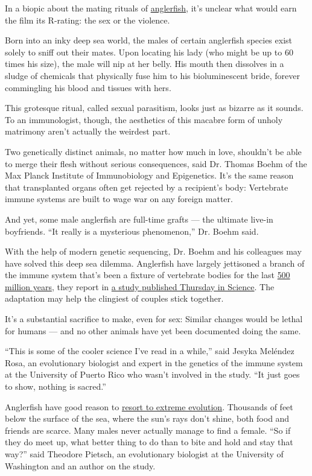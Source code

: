 In a biopic about the mating rituals of
\href{https://www.nytimes3xbfgragh.onion/2019/07/29/science/anglerfish-bioluminescence-deep-sea.html}{anglerfish},
it's unclear what would earn the film its R-rating: the sex or the
violence.

Born into an inky deep sea world, the males of certain anglerfish
species exist solely to sniff out their mates. Upon locating his lady
(who might be up to 60 times his size), the male will nip at her belly.
His mouth then dissolves in a sludge of chemicals that physically fuse
him to his bioluminescent bride, forever commingling his blood and
tissues with hers.

This grotesque ritual, called sexual parasitism, looks just as bizarre
as it sounds. To an immunologist, though, the aesthetics of this macabre
form of unholy matrimony aren't actually the weirdest part.

Two genetically distinct animals, no matter how much in love, shouldn't
be able to merge their flesh without serious consequences, said Dr.
Thomas Boehm of the Max Planck Institute of Immunobiology and
Epigenetics. It's the same reason that transplanted organs often get
rejected by a recipient's body: Vertebrate immune systems are built to
wage war on any foreign matter.

And yet, some male anglerfish are full-time grafts --- the ultimate
live-in boyfriends. ``It really is a mysterious phenomenon,'' Dr. Boehm
said.

With the help of modern genetic sequencing, Dr. Boehm and his colleagues
may have solved this deep sea dilemma. Anglerfish have largely
jettisoned a branch of the immune system that's been a fixture of
vertebrate bodies for the last
\href{https://www.ncbi.nlm.nih.gov/pmc/articles/PMC3805090/}{500 million
years}, they report in
\href{https://science.sciencemag.org/lookup/doi/10.1126/science.aaz9445}{a
study published Thursday in Science}. The adaptation may help the
clingiest of couples stick together.

It's a substantial sacrifice to make, even for sex: Similar changes
would be lethal for humans --- and no other animals have yet been
documented doing the same.

``This is some of the cooler science I've read in a while,'' said Jesyka
Meléndez Rosa, an evolutionary biologist and expert in the genetics of
the immune system at the University of Puerto Rico who wasn't involved
in the study. ``It just goes to show, nothing is sacred.''

Anglerfish have good reason to
\href{https://www.nytimes3xbfgragh.onion/2020/07/16/science/ultra-black-fish.html}{resort
to extreme evolution}. Thousands of feet below the surface of the sea,
where the sun's rays don't shine, both food and friends are scarce. Many
males never actually manage to find a female. ``So if they do meet up,
what better thing to do than to bite and hold and stay that way?'' said
Theodore Pietsch, an evolutionary biologist at the University of
Washington and an author on the study.

